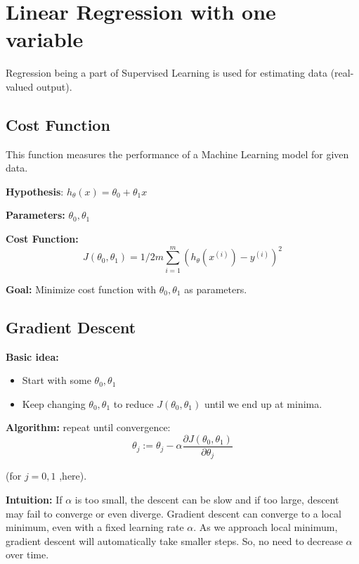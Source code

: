 \section{Linear Regression with one variable}
  Regression being a part of Supervised Learning is used for estimating data (real-valued output).  

  \subsection{Cost Function}
    This function measures the performance of a Machine Learning model for given data.

    \textbf{Hypothesis}: $ h_ \theta(x) = \theta_0 + \theta_1x $

    \textbf{Parameters:} $ \theta_0, \theta_1 $

    \textbf{Cost Function:} 
    \begin{equation} \label {eq:1}
      J( \theta_0, \theta_1 ) = 1/2m \sum_{i=1}^{m} (h_\theta(x^{(i)})-y^{(i)})^2 
    \end{equation} 

    \textbf{Goal:} Minimize cost function with $ \theta_0, \theta_1 $ as parameters.

  \subsection{Gradient Descent}

    \textbf{Basic idea:}
    \begin{itemize}
    \item Start with some $ \theta_0, \theta_1 $
    \item Keep changing $ \theta_0, \theta_1 $ to reduce $ J(\theta_0, \theta_1) $ until we end up at minima.
    \end{itemize} 

    \textbf{Algorithm:}
     repeat until convergence:
    \begin{equation} \label {eq:2}
      \theta_j := \theta_j - \alpha \frac{\partial {J(\theta_0, \theta_1)}}{\partial \theta_j}
    \end{equation} 

    (for  $j = 0, 1 $  ,here).  

    \textbf{Intuition:} 
    If $\alpha$ is too small, the descent can be slow and if too large, descent may fail to converge or even diverge.
    Gradient descent can converge to a local minimum, even with a fixed learning rate $\alpha$. As we approach local minimum, gradient descent will automatically take smaller steps. So, no need to decrease $\alpha$ over time. 

